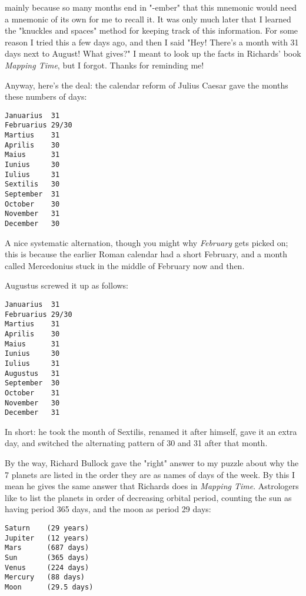 mainly because so many months end in "-ember" that this mnemonic
would need a mnemonic of its own for me to recall it.  It was only
much later that I learned the "knuckles and spaces" method for
keeping track of this information.  For some reason I tried this
a few days ago, and then I said "Hey!  There's a month with 31 days 
next to August!  What gives?"  I meant to look up the facts in 
Richards' book \emph{Mapping Time}, but I forgot.  Thanks for reminding
me!

Anyway, here's the deal: the calendar reform of Julius Caesar
gave the months these numbers of days:

\begin{verbatim}
Januarius  31
Februarius 29/30
Martius    31
Aprilis    30
Maius      31
Iunius     30
Iulius     31
Sextilis   30
September  31
October    30
November   31
December   30
\end{verbatim}
    
A nice systematic alternation, though you might why \emph{February} gets
picked on; this is because the earlier Roman calendar had a short
February, and a month called Mercedonius stuck in the middle of
February now and then. 

Augustus screwed it up as follows:

\begin{verbatim}
Januarius  31
Februarius 29/30
Martius    31
Aprilis    30
Maius      31
Iunius     30
Iulius     31
Augustus   31
September  30
October    31
November   30
December   31
\end{verbatim}
    
In short: he took the month of Sextilis, renamed it after himself, 
gave it an extra day, and switched the alternating pattern of 30 and
31 after that month.  

By the way, Richard Bullock gave the "right" answer to my puzzle 
about why the 7 planets are listed in the order they are as names 
of days of the week.  By this I mean he gives the same answer that 
Richards does in \emph{Mapping Time}.  Astrologers like to list the 
planets in order of decreasing orbital period, counting the sun 
as having period 365 days, and the moon as period 29 days:

\begin{verbatim}
Saturn    (29 years)
Jupiter   (12 years)
Mars      (687 days)
Sun       (365 days)
Venus     (224 days)
Mercury   (88 days)
Moon      (29.5 days)
\end{verbatim}
    

